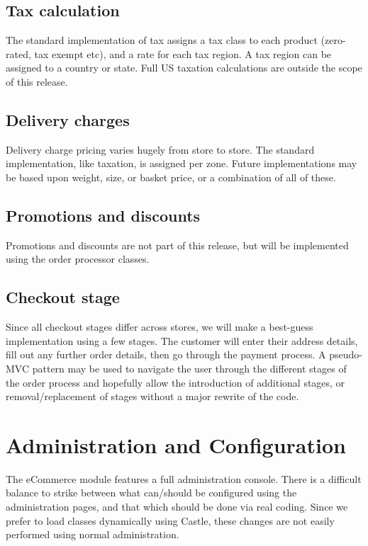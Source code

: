 \documentclass[12pt]{article}
\begin{document}
\subsection{Tax calculation}
The standard implementation of tax assigns a tax class to each product (zero-rated, tax exempt etc), and a rate for each tax region. A tax region can be assigned to a country or state. Full US taxation calculations are outside the scope of this release.

\subsection{Delivery charges}
Delivery charge pricing varies hugely from store to store. The standard implementation, like taxation, is assigned per zone. Future implementations may be based upon weight, size, or basket price, or a combination of all of these.

\subsection{Promotions and discounts}
Promotions and discounts are not part of this release, but will be implemented using the order processor classes.

\subsection{Checkout stage}
Since all checkout stages differ across stores, we will make a best-guess implementation using a few stages. The customer will enter their address details, fill out any further order details, then go through the payment process. A pseudo-\textsc{MVC} pattern may be used to navigate the user through the different stages of the order process and hopefully allow the introduction of additional stages, or removal/replacement of stages without a major rewrite of the code.

\section{Administration and Configuration}
The eCommerce module features a full administration console. There is a difficult balance to strike between what can/should be configured using the administration pages, and that which should be done via real coding. Since we prefer to load classes dynamically using Castle, these changes are not easily performed using normal administration.
\end{document}
